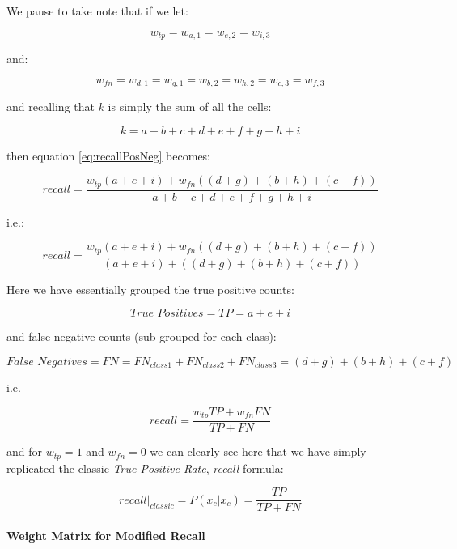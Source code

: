 \documentclass[]{article}
\begin{document}
\noindent We pause to take note that if we let:

\[w_{tp} = w_{a,1} = w_{e,2} = w_{i,3}\]

\noindent and:

\[w_{fn} = w_{d,1} = w_{g,1} = w_{b,2} = w_{h,2} = w_{c,3} = w_{f,3}\]

\noindent and recalling that $k$ is simply the sum of all the cells:

\[k = a + b + c + d + e + f + g + h + i\]

\noindent then equation \ref{eq:recallPosNeg} becomes:

\begin{equation}
\textit{recall} = \frac{w_{tp}(a + e + i) + w_{fn}((d + g) + (b + h) + (c + f))}{a + b + c + d + e + f + g + h + i}
\end{equation}

\noindent i.e.:

\begin{equation}
\textit{recall} = \frac{
	w_{tp}(a + e + i)
	+ 
	w_{fn}((d + g) + (b + h) + (c + f))
}
{(a + e + i) + ((d + g) + (b + h) + (c + f))}
\end{equation}

\noindent Here we have essentially grouped the true positive counts:

\[\textit{True Positives} = {TP} = a + e + i\]

\noindent and false negative counts (sub-grouped for each class):

\[\textit{False Negatives} = {FN} = FN_{class1} + FN_{class2} + FN_{class3} = (d + g) + (b + h) + (c + f)\]

\noindent i.e.

\begin{equation}
\textit{recall} = \frac{
	w_{tp}{TP}
	+ 
	w_{fn}{FN}
}
{{TP} + {FN}}
\end{equation}

\noindent and for $w_{tp} = 1$ and $w_{fn} = 0$ we can clearly see here that we have simply replicated the classic \textit{True Positive Rate}, \textit{recall} formula:

\begin{equation}
\textit{recall}\rvert_{classic} = P(\hat{x_c}|x_c) = \frac{{TP}}{{TP} + {FN}}
\end{equation}

\paragraph{Weight Matrix for Modified Recall}
\end{document}
